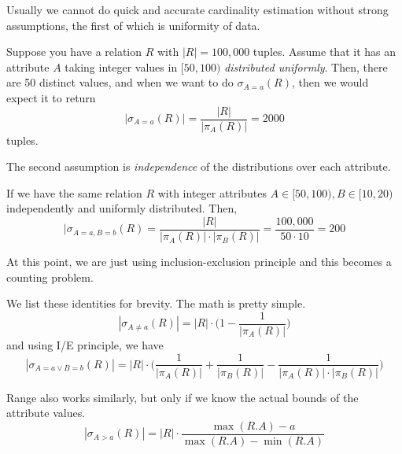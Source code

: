    Usually we cannot do quick and accurate cardinality estimation without strong assumptions, the first of which is uniformity of data. 

    \begin{example}
      Suppose you have a relation $R$ with $|R| = 100,000$ tuples. Assume that it has an attribute $A$ taking integer values in $[50, 100)$ \textit{distributed uniformly}. Then, there are 50 distinct values, and when we want to do $\sigma_{A = a} (R)$, then we would expect it to return 
      \begin{equation}
        |\sigma_{A = a} (R)| = \frac{|R|}{|\pi_A(R)|} = 2000
      \end{equation}
      tuples.
    \end{example}

    The second assumption is \textit{independence} of the distributions over each attribute. 

    \begin{example}
      If we have the same relation $R$ with integer attributes $A \in [50, 100), B \in [10, 20)$ independently and uniformly distributed. Then, 
      \begin{equation}
        |\sigma_{A = a, B = b} (R) = \frac{|R|}{|\pi_A (R)| \cdot |\pi_B(R)|} = \frac{100,000}{50 \cdot 10} = 200
      \end{equation}
    \end{example}

    At this point, we are just using inclusion-exclusion principle and this becomes a counting problem. 

    \begin{example}
      We list these identities for brevity. The math is pretty simple. 
      \begin{equation}
        |\sigma_{A \neq a} (R)| = |R| \cdot \bigg( 1 - \frac{1}{|\pi_A (R)|} \bigg)
      \end{equation}
      and using I/E principle, we have 
      \begin{equation}
        |\sigma_{A = a \lor B = b} (R)| = |R| \cdot \bigg( \frac{1}{|\pi_A (R)|}  + \frac{1}{|\pi_B (R)|} - \frac{1}{|\pi_A (R)| \cdot |\pi_B(R)|} \bigg)
      \end{equation}
    \end{example}

    \begin{example}
      Range also works similarly, but only if we know the actual bounds of the attribute values.  
      \begin{equation}
        |\sigma_{A > a} (R)| = |R| \cdot \frac{\max(R.A) - a}{\max(R.A) - \min(R.A)}
      \end{equation}
    \end{example}

